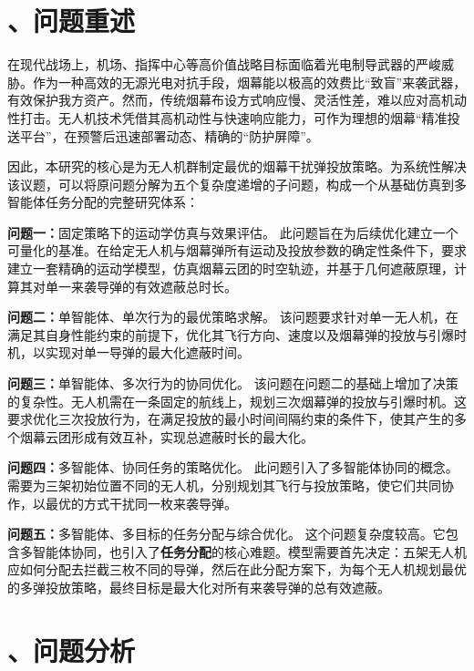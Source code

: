 \documentclass[12pt]{article}
\begin{document}
\begin{CJK}{UTF8}{gbsn}
\begin{abstract}
			
		\end{abstract}
		
		\newpage
		
		\section{、问题重述}
		
		
		在现代战场上，机场、指挥中心等高价值战略目标面临着光电制导武器的严峻威胁。作为一种高效的无源光电对抗手段，烟幕能以极高的效费比“致盲”来袭武器，有效保护我方资产。然而，传统烟幕布设方式响应慢、灵活性差，难以应对高机动性打击。无人机技术凭借其高机动性与快速响应能力，可作为理想的烟幕“精准投送平台”，在预警后迅速部署动态、精确的“防护屏障”。
		
		因此，本研究的核心是为无人机群制定最优的烟幕干扰弹投放策略。为系统性解决该议题，可以将原问题分解为五个复杂度递增的子问题，构成一个从基础仿真到多智能体任务分配的完整研究体系：
		
		\textbf{问题一：}固定策略下的运动学仿真与效果评估。
		此问题旨在为后续优化建立一个可量化的基准。在给定无人机与烟幕弹所有运动及投放参数的确定性条件下，要求建立一套精确的运动学模型，仿真烟幕云团的时空轨迹，并基于几何遮蔽原理，计算其对单一来袭导弹的有效遮蔽总时长。
		
		\textbf{问题二：}单智能体、单次行为的最优策略求解。
		该问题要求针对单一无人机，在满足其自身性能约束的前提下，优化其飞行方向、速度以及烟幕弹的投放与引爆时机，以实现对单一导弹的最大化遮蔽时间。
		
		\textbf{问题三：}单智能体、多次行为的协同优化。
		该问题在问题二的基础上增加了决策的复杂性。无人机需在一条固定的航线上，规划三次烟幕弹的投放与引爆时机。这要求优化三次投放行为，在满足投放的最小时间间隔约束的条件下，使其产生的多个烟幕云团形成有效互补，实现总遮蔽时长的最大化。
		
		\textbf{问题四：}多智能体、协同任务的策略优化。
		此问题引入了多智能体协同的概念。需要为三架初始位置不同的无人机，分别规划其飞行与投放策略，使它们共同协作，以最优的方式干扰同一枚来袭导弹。
		
		\textbf{问题五：}多智能体、多目标的任务分配与综合优化。
		这个问题复杂度较高。它包含多智能体协同，也引入了\textbf{任务分配}的核心难题。模型需要首先决定：五架无人机应如何分配去拦截三枚不同的导弹，然后在此分配方案下，为每个无人机规划最优的多弹投放策略，最终目标是最大化对所有来袭导弹的总有效遮蔽。
		
		\section{、问题分析}
		

\end{CJK}
\end{document}
